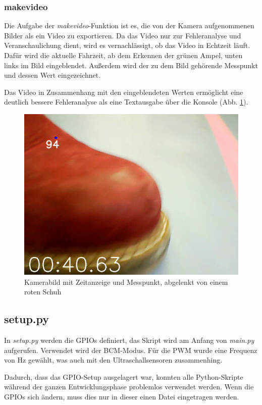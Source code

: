 \documentclass[a4paper, 12pt]{scrartcl}
\begin{document}
\subsubsection{makevideo}


Die Aufgabe der \textit{makevideo}-Funktion ist es, die von der Kamera aufgenommenen Bilder als ein Video zu exportieren. Da das Video nur zur Fehleranalyse und Veranschaulichung dient, wird es vernachlässigt, ob das Video in Echtzeit läuft. Dafür wird die aktuelle Fahrzeit, ab dem Erkennen der grünen Ampel, unten links im Bild eingeblendet. Außerdem wird der zu dem Bild gehörende Messpunkt und dessen Wert eingezeichnet.

Das Video in Zusammenhang mit den eingeblendeten Werten ermöglicht eine deutlich bessere Fehleranalyse als eine Textausgabe über die Konsole (Abb. \ref{schuh_im_bild}).

\begin{figure}[H] 
	\centering
	\includegraphics[width=.5\textwidth]{schuh_im_bild.png}
	\caption{Kamerabild mit Zeitanzeige und Messpunkt, abgelenkt von einem roten Schuh}
	\label{schuh_im_bild}
\end{figure}

\subsection{setup.py}


In \textit{setup.py} werden die GPIOs definiert, das Skript wird am Anfang von \textit{main.py} aufgerufen. Verwendet wird der BCM-Modus. Für die PWM wurde eine Frequenz von \unit[73]{Hz} gewählt, was auch mit den Ultraschallsensoren zusammenhing.

Dadurch, dass das GPIO-Setup ausgelagert war, konnten alle Python-Skripte während der ganzen Entwicklungsphase problemlos verwendet werden. Wenn die GPIOs sich ändern, muss dies nur in dieser einen Datei eingetragen werden.
\end{document}
